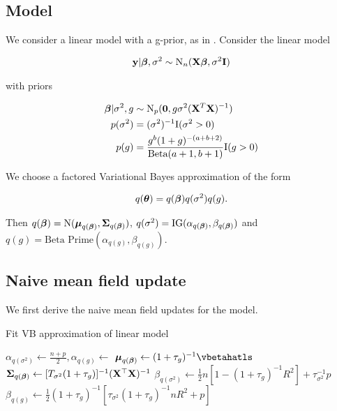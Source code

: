 \documentclass{amsart}[12pt]
\begin{document}
\subsection{Model}

We consider a linear model with a g-prior, as in \cite{Liang2008}. Consider the linear model

\begin{align*}
{\bf y} | {\boldsymbol \beta}, \sigma^2 \sim \text{N}_n({\bf X} {\boldsymbol \beta}, \sigma^2 {\bf I})
\end{align*}

with priors

\begin{align*}
{\boldsymbol\beta} | \sigma^2, g &\sim \text{N}_p({\bf 0}, g \sigma^2 ({\bf X}^T {\bf X})^{-1}) \\
p(\sigma^2) &= (\sigma^2)^{-1} \text{I}(\sigma^2 > 0) \\
p(g) &= \frac{g^b (1 + g)^{-(a + b + 2)}}{\text{Beta}(a + 1, b + 1)} \text{I}(g > 0)
\end{align*}

We choose a factored Variational Bayes approximation of the form

\begin{align*}
q({\boldsymbol \theta}) = q({\boldsymbol \beta}) q(\sigma^2) q(g).
\end{align*}

Then $q({\boldsymbol \beta}) = \text{N}({\boldsymbol \mu}_{q({\boldsymbol \beta})}, {\boldsymbol \Sigma}_{q({\boldsymbol \beta})})$, $q(\sigma^2) = \text{IG}(\alpha_{q({\boldsymbol \beta})}, \beta_{q({\boldsymbol \beta})})$ and $q(g) = \text{Beta Prime}(\alpha_{q(g)}, \beta_{q(g)})$.

\subsection{Naive mean field update}

We first derive the naive mean field updates for the model.

\begin{algorithm}
\label{alg:algorithm_one}
\caption{Fit VB approximation of linear model}
\begin{algorithmic}
\REQUIRE $\alpha_{q(\sigma^2)} \leftarrow \frac{n + p}{2}, \alpha_{q(g)} \leftarrow$
\STATE $\vmu_{q(\vbeta)} \leftarrow (1 + \tau_g)^{-1} \vbetahatls$
\STATE ${\boldsymbol \Sigma}_{q({\boldsymbol \beta})} \leftarrow [T_{\sigma^2} (1 + \tau_g)]^{-1} ({\bf X}^\top {\bf X})^{-1}$
\STATE $\beta_{q(\sigma^2)} \leftarrow  \frac{1}{2} {n[1 - (1 + \tau_g)^{-1} R^2] + \tau_{\sigma^2}^{-1} p}$
\STATE $\beta_{q(g)} \leftarrow \frac{1}{2} (1 + \tau_g)^{-1} [\tau_{\sigma^2} (1 + \tau_g)^{-1} n R^2 + p]$
\ENDWHILE
\end{algorithmic}
\end{algorithm}
\end{document}
